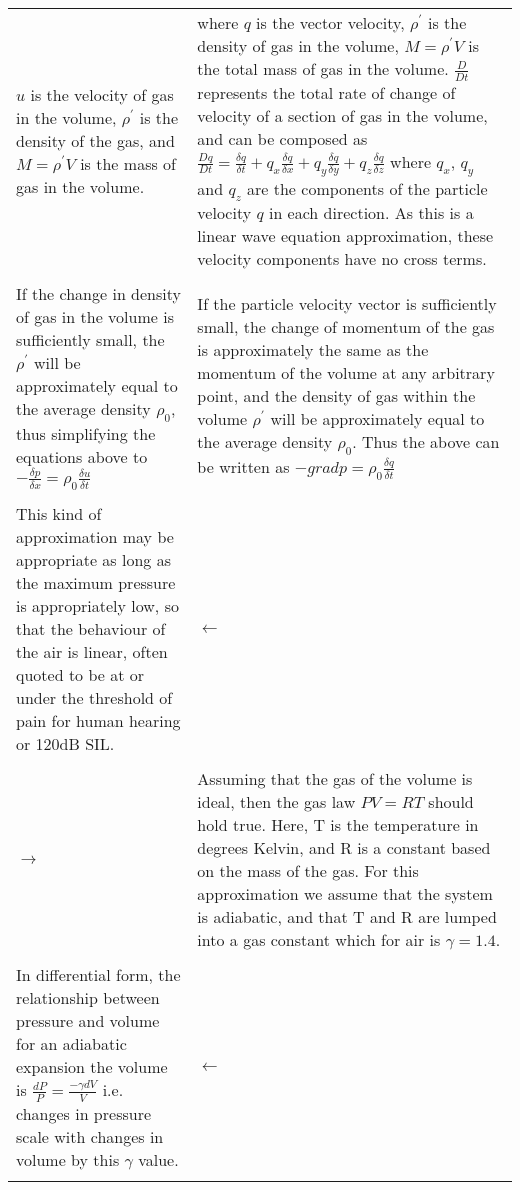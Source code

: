 \begin{center}
\begin{longtable}{|p{}|p{}|}
 $u$ is the velocity of gas in the volume, $\rho^{\prime}$ is the density of the gas, and $M = \rho^{\prime} V$ is the mass of gas in the volume.  & where $q$ is the vector velocity, $\rho^{\prime}$ is the density of gas in the volume, $M = \rho^{\prime} V$ is the total mass of gas in the volume. $\frac{D}{Dt}$ represents the total rate of change of velocity of a section of gas in the volume, and can be composed as $\frac{Dq}{Dt}=\frac{\delta q}{\delta t}+ q_x\frac{\delta q}{\delta x}+q_y\frac{\delta q}{\delta y}+q_z\frac{\delta q}{\delta z}$ where $q_x$, $q_y$ and $q_z$ are the components of the particle velocity \textbf{$q$} in each direction. As this is a linear wave equation approximation, these velocity components have no cross terms.\\
\\
If the change in density of gas in the volume is sufficiently small, the $\rho^{\prime}$ will be approximately equal to the average density $\rho_0$, thus simplifying the equations above to $-\frac{\delta p}{\delta x} = \rho_0 \frac{\delta u}{\delta t}$  & If the particle velocity vector is sufficiently small, the change of momentum of the gas is approximately the same as the momentum of the volume at any arbitrary point, and the density of gas within the volume $\rho^{\prime}$ will be approximately equal to the average density $\rho_0$. Thus the above can be written as $-grad p = \rho_0 \frac{\delta q}{\delta t}$ \\
\\
 This kind of approximation may be appropriate as long as the maximum pressure is appropriately low, so that the behaviour of the air is linear, often quoted to be at or under the threshold of pain for human hearing or 120dB SIL.  & $ \leftarrow$\\
\\
$ \rightarrow$ & Assuming that the gas of the volume is ideal, then the gas law $ PV = RT $ should hold true. Here, T is the temperature in degrees Kelvin, and R is a constant based on the mass of the gas. For this approximation we assume that the system is adiabatic, and that T and R are lumped into a gas constant which for air is $\gamma = 1.4$.  \\
\\
In differential form, the relationship between pressure and volume for an adiabatic expansion the volume is $\frac{dP}{P} = \frac{-\gamma dV}{V} $ i.e. changes in pressure scale with changes in volume by this $\gamma$ value. & $\leftarrow$ \\
\\

\end{longtable}
\end{center}
